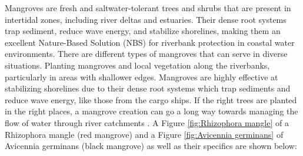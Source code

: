 Mangroves are fresh and saltwater-tolerant trees and shrubs that are present in intertidal zones, including river deltas and estuaries. Their dense root systems trap sediment, reduce wave energy, and stabilize shorelines, making them an excellent Nature-Based Solution (NBS) for riverbank protection in coastal water environments. There are different types of mangroves that can serve in diverse situations. Planting mangroves and local vegetation along the riverbanks, particularly in areas with shallower edges. Mangroves are highly effective at stabilizing shorelines due to their dense root systems which trap sediments and reduce wave energy, like those from the cargo ships. If the right trees are planted in the right places, a mangrove creation can go a long way towards managing the flow of water through river catchments \autocite{ferreiraPropagulosMangueVermelho2024}. A Figure \ref{fig:Rhizophora mangle} of a Rhizophora mangle (red mangrove) and a Figure \ref{fig:Avicennia germinans} of Avicennia germinans (black mangrove) as well as their specifics are shown below:

